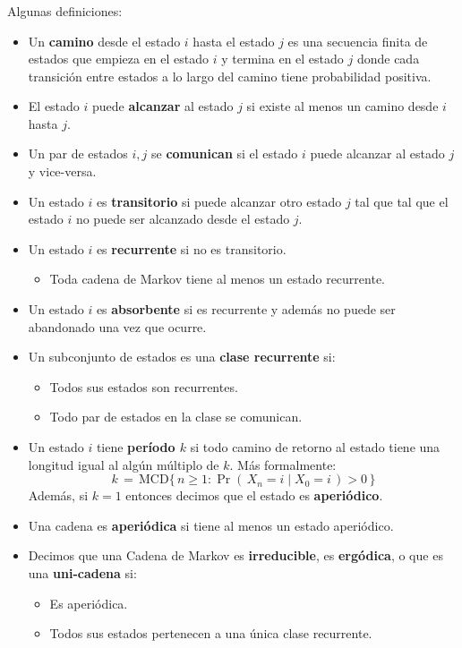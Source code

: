 \documentclass[ 10pt, xcolor = dvipsnames]{beamer}
\begin{document}
\begin{frame}[allowframebreaks]
\frametitle{\insertsubsection}

Algunas definiciones:
\begin{itemize}
\item Un \textbf{camino} desde el estado $i$ hasta el estado $j$ es una secuencia finita de estados que empieza en el estado $i$ y termina en el estado $j$ donde cada transici\'on entre estados a lo largo del camino tiene probabilidad positiva. 
\item El estado $i$ puede \textbf{alcanzar} al estado $j$ si existe al menos un camino \linebreak desde $i$ hasta $j$. 
\item Un par de estados $i,j$ se \textbf{comunican} si el estado $i$ puede alcanzar al \linebreak estado $j$ y vice-versa. 
\item Un estado $i$ es \textbf{transitorio} si puede alcanzar otro estado $j$ tal que tal que \linebreak el estado $i$ no puede ser alcanzado desde el estado $j$. 
\item Un estado $i$ es \textbf{recurrente} si no es transitorio. 
\begin{itemize}
\item Toda cadena de Markov tiene al menos un estado recurrente. 
\end{itemize}
\framebreak
\item Un estado $i$ es \textbf{absorbente} si es recurrente y adem\'as no puede ser abandonado una vez que ocurre. 
\item Un subconjunto de estados es una \textbf{clase recurrente} si:
\begin{itemize}
\item Todos sus estados son recurrentes. 
\item Todo par de estados en la clase se comunican. 
\end{itemize}
\item Un estado $i$ tiene \textbf{per\'iodo $k$} si todo camino de retorno al estado tiene una longitud igual al alg\'un m\'ultiplo de $k$. M\'as formalmente:
\[
k \, = \, \text{MCD} \{ \, n \geq 1 \colon \Pr( \, X_n = i \mid X_0 = i \, ) > 0 \, \}
\]
Adem\'as, si $k = 1$ entonces decimos que el estado es \textbf{aperi\'odico}. 
\item Una cadena es \textbf{aperi\'odica} si tiene al menos un estado aperi\'odico. 
\framebreak
\item Decimos que una Cadena de Markov es \textbf{irreducible}, es \textbf{erg\'odica}, o que es una \textbf{uni-cadena} si: 
\begin{itemize}
\item Es aperi\'odica. 
\item Todos sus estados pertenecen a una \'unica clase recurrente. 
\end{itemize}
\end{itemize}
\fullskip

\end{frame}
\end{document}
